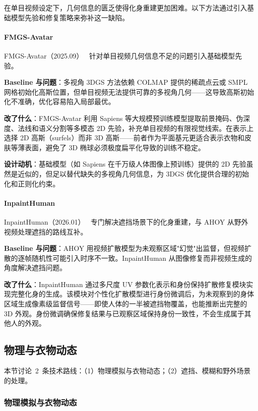 在单目视频设定下，几何信息的匮乏使得化身重建更加困难。以下方法通过引入基础模型先验和修复策略来弥补这一缺陷。

\paragraph{FMGS-Avatar}

FMGS-Avatar（2025.09）~\cite{2509_14739} 针对单目视频几何信息不足的问题引入基础模型先验。

\textbf{Baseline 与问题}：多视角 3DGS 方法依赖 COLMAP 提供的稀疏点云或 SMPL 网格初始化高斯位置，但单目视频无法提供可靠的多视角几何——这导致高斯初始化不准确，优化容易陷入局部最优。

\textbf{改了什么}：FMGS-Avatar 利用 Sapiens 等大规模预训练模型提取前景掩码、伪深度、法线和语义分割等多模态 2D 先验，补充单目视频的有限视觉线索。在表示上选择 2D 高斯（surfels）而非 3D 高斯——前者作为平面基元更适合表示衣物和皮肤等薄表面，避免了 3D 椭球必须极度扁平化导致的训练不稳定。

\textbf{设计动机}：基础模型（如 Sapiens 在千万级人体图像上预训练）提供的 2D 先验虽然是近似的，但足以替代缺失的多视角几何信息，为 3DGS 优化提供合理的初始化和正则化约束。

\paragraph{InpaintHuman}

InpaintHuman（2026.01）~\cite{2601_02098} 专门解决遮挡场景下的化身重建，与 AHOY 从野外视频处理遮挡的路线互补。

\textbf{Baseline 与问题}：AHOY 用视频扩散模型为未观察区域"幻觉"出监督，但视频扩散的逐帧随机性可能引入时序不一致。InpaintHuman 从图像修复而非视频生成的角度解决遮挡问题。

\textbf{改了什么}：InpaintHuman 通过多尺度 UV 参数化表示和身份保持扩散修复模块实现完整化身的生成。该模块对个性化扩散模型进行身份微调后，为未观察到的身体区域生成像素级监督信号——即使人体的一半被遮挡物覆盖，也能推断出完整的 3D 外观。身份微调确保修复结果与已观察区域保持身份一致性，不会生成属于其他人的外观。

\subsection{物理与衣物动态}
\label{ss:16_2_物理与衣}

本节讨论~2~条技术路线：（1）物理模拟与衣物动态；（2）遮挡、模糊和野外场景的处理。

\subsubsection{物理模拟与衣物动态}

